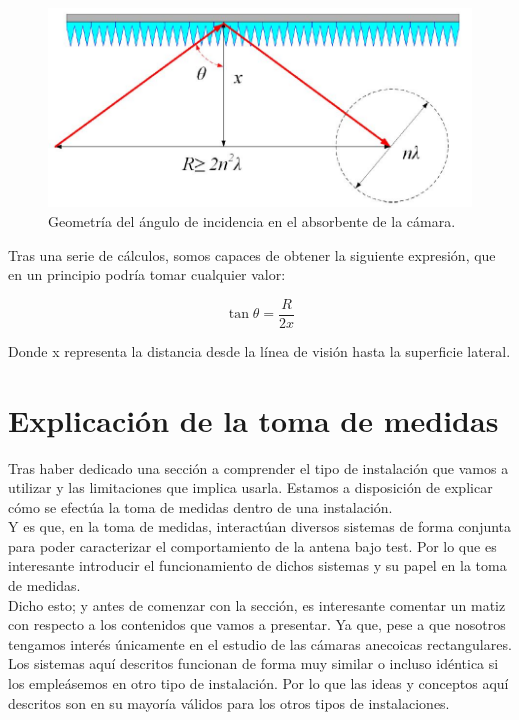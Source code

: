 \documentclass{article}
\begin{document}
\begin{figure}[h]
    \centering
    \includegraphics[scale=0.65]{Figura2-Geometria del angulo incidencia}
    \caption{Geometría del ángulo de incidencia en el absorbente de la cámara.}
    \label{Geometría-del-ángulo-incidencia-absorvente}
\end{figure}


Tras una serie de cálculos, somos capaces de obtener la siguiente expresión, que en un principio podría tomar cualquier valor: 

                        \begin{equation}
                        \tan\theta =\frac{R}{2x}
                        \end{equation}

Donde x representa la distancia desde la línea de visión hasta la superficie lateral. 

\newpage
\section{Explicación de la toma de medidas}
Tras haber dedicado una sección a comprender el tipo de instalación que vamos a utilizar y las limitaciones que implica usarla. Estamos a disposición de explicar cómo se efectúa la toma de medidas dentro de una instalación. 
\\

Y es que, en la toma de medidas, interactúan diversos sistemas de forma conjunta para poder caracterizar el comportamiento de la antena bajo test. Por lo que es interesante introducir el funcionamiento de dichos sistemas y su papel en la toma de medidas. 
\\

Dicho esto; y antes de comenzar con la sección, es interesante comentar un matiz con respecto a los contenidos que vamos a presentar. Ya que, pese a que nosotros tengamos interés únicamente en el estudio de las cámaras anecoicas rectangulares. Los sistemas aquí descritos funcionan de forma muy similar o incluso idéntica si los empleásemos en otro tipo de instalación. Por lo que las ideas y conceptos aquí descritos son en su mayoría válidos para los otros tipos de instalaciones. 
\end{document}
